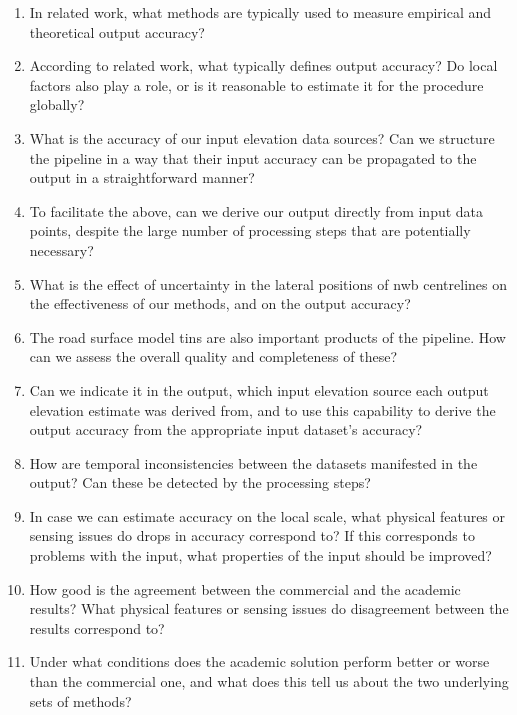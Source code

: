 \begin{enumerate}
    \begin{enumerate}
        \item In related work, what methods are typically used to measure empirical and theoretical output accuracy?
        \item According to related work, what typically defines output accuracy? Do local factors also play a role, or is it reasonable to estimate it for the procedure globally?
        \item What is the accuracy of our input elevation data sources? Can we structure the pipeline in a way that their input accuracy can be propagated to the output in a straightforward manner?
        \item To facilitate the above, can we derive our output directly from input data points, despite the large number of processing steps that are potentially necessary?
        \item What is the effect of uncertainty in the lateral positions of \ac{nwb} centrelines on the effectiveness of our methods, and on the output accuracy?
        \item The road surface model \ac{tin}s are also important products of the pipeline. How can we assess the overall quality and completeness of these?
        \item Can we indicate it in the output, which input elevation source each output elevation estimate was derived from, and to use this capability to derive the output accuracy from the appropriate input dataset's accuracy?
        \item How are temporal inconsistencies between the datasets manifested in the output? Can these be detected by the processing steps?
        \item In case we can estimate accuracy on the local scale, what physical features or sensing issues do drops in accuracy correspond to? If this corresponds to problems with the input, what properties of the input should be improved?
        \item How good is the agreement between the commercial and the academic results? What physical features or sensing issues do disagreement between the results correspond to?
        \item Under what conditions does the academic solution perform better or worse than the commercial one, and what does this tell us about the two underlying sets of methods?
    \end{enumerate}
\end{enumerate}